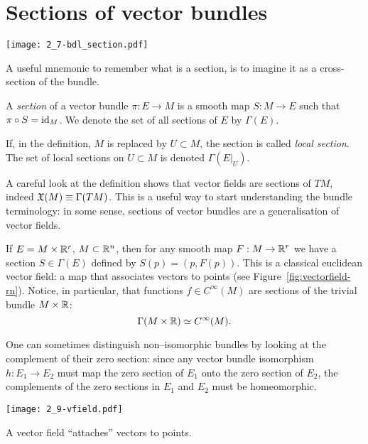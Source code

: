 \section{Sections of vector bundles}

\begin{marginfigure}
  \texttt{[image: 2\_7-bdl\_section.pdf]}
  \caption{A useful mnemonic to remember what is a section, is to imagine it as a cross-section of the bundle.}
\end{marginfigure}

\begin{definition}
  A \emph{section} of a vector bundle $\pi:E \to M$ is a smooth map $S:M \to E$ such that $\pi\circ S = \operatorname{id}_M$. We denote the set of all sections of $E$ by $\Gamma(E)$.

  If, in the definition, $M$ is replaced by $U\subset M$, the section is called \emph{local section}. The set of local sections on $U\subset M$ is denoted $\Gamma(E|_U)$.
\end{definition}

\begin{remark}
  A careful look at the definition shows that vector fields are sections of $TM$, indeed $\mathfrak{X}(M) \equiv \Gamma(TM)$.
  This is a useful way to start understanding the bundle terminology: in some sense, sections of vector bundles are a generalisation of vector fields.
\end{remark}

\begin{example}
  If $E = M\times \mathbb{R}^r$, $M\subset\mathbb{R}^n$, then for any smooth map $F: M\to\mathbb{R}^r$ we have a section $S\in\Gamma(E)$ defined by $S(p) = (p, F(p))$. This is a classical euclidean vector field: a map that associates vectors to points (see Figure~\ref{fig:vectorfield-rn}).
  Notice, in particular, that functions $f\in C^\infty(M)$ are sections of the trivial bundle $M\times\mathbb{R}$:
  \begin{equation}
    \Gamma(M\times\mathbb{R}) \simeq C^\infty(M).
  \end{equation}
\end{example}

One can sometimes distinguish non--isomorphic bundles by looking at the complement of their zero section: since any vector bundle isomorphism $h:E_1\to E_2$ must map the zero section of $E_1$ onto the zero section of $E_2$, the complements of the zero sections in $E_1$ and $E_2$ must be homeomorphic.

\begin{marginfigure}
  \texttt{[image: 2\_9-vfield.pdf]}
  \caption{A vector field ``attaches'' vectors to points.}%
  \label{fig:vectorfield-rn}
\end{marginfigure}

